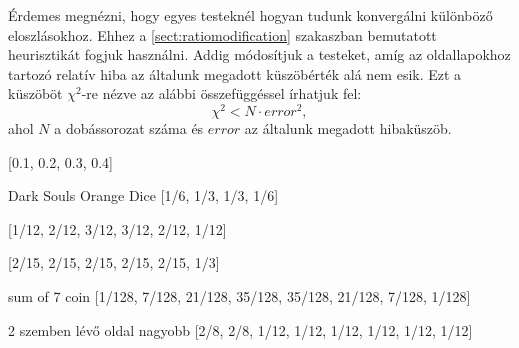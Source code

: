 
Érdemes megnézni, hogy egyes testeknél hogyan tudunk konvergálni különböző eloszlásokhoz.
Ehhez a \ref{sect:ratiomodification} szakaszban bemutatott heurisztikát fogjuk használni.
Addig módosítjuk a testeket, amíg az oldallapokhoz tartozó relatív hiba az általunk megadott küszöbérték alá nem esik.
Ezt a küszöböt $\chi^2$-re nézve az alábbi összefüggéssel írhatjuk fel:
\[
\chi^2 < N \cdot error^2,
\]
ahol $N$ a dobássorozat száma és $error$ az általunk megadott hibaküszöb. 


[0.1, 0.2, 0.3, 0.4]

Dark Souls Orange Dice
[1/6, 1/3, 1/3, 1/6]


[1/12, 2/12, 3/12, 3/12, 2/12, 1/12]

[2/15, 2/15, 2/15, 2/15, 2/15, 1/3]


sum of 7 coin
[1/128, 7/128, 21/128, 35/128, 35/128, 21/128, 7/128, 1/128]

2 szemben lévő oldal nagyobb
[2/8, 2/8, 1/12, 1/12, 1/12, 1/12, 1/12, 1/12]
